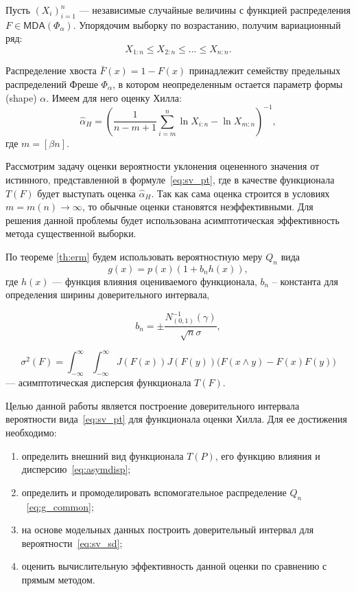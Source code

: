 \documentclass[12pt, specialist, subf, substylefile = spbu.rtx]{disser}
\newcommand{\MDA}{\mathsf{MDA}}
\begin{document}
Пусть $(X_i)_{i=1}^n$ --- независимые случайные величины с функцией распределения $F \in \MDA(\Phi_\alpha)$. Упорядочим выборку по возрастанию, получим вариационный ряд:
$$
X_{1:n} \le X_{2:n} \le ... \le X_{n:n}.
$$

Распределение хвоста $\bar{F}(x)=1-F(x)$ принадлежит семейству предельных распределений Фреше $\Phi_\alpha$, в котором неопределенным остается параметр формы (shape) $\alpha$. Имеем для него оценку Хилла:
\begin{equation}\label{eq:hill_est}
\hat{\alpha}_H=
\left(\frac{1}{n-m+1} \sum\limits_{i=m}^n \ln X_{i:n}-\ln X_{m:n} \right)^{-1},
\end{equation}
где $m=[\beta n]$.

Рассмотрим задачу оценки вероятности уклонения оцененного значения от истинного, представленной в формуле~\eqref{eq:sv_pt}, где в качестве функционала $T(F)$ будет выступать оценка $\hat{\alpha}_H$. Так как сама оценка строится в условиях $m=m(n) \to \infty$, то обычные оценки становятся неэффективными. Для решения данной проблемы будет использована асимптотическая эффективность метода существенной выборки.

По теореме \ref{th:erm} будем использовать вероятностную меру $Q_n$ вида
\begin{equation}\label{eq:g_common}
g(x)=p(x)(1+b_nh(x)),
\end{equation}
где $h(x)$ --- функция влияния оцениваемого функционала, $b_n$ -- константа для определения ширины доверительного интервала, 

\begin{equation}\label{eq:bn}
b_n = \pm\frac{N_{(0,1)}^{-1}(\gamma)}{\sqrt{n}\sigma},
\end{equation}

\begin{equation}\label{eq:asymdisp}
\sigma^2(F)= \int_{-\infty}^\infty \int_{-\infty}^\infty J(F(x)) J(F(y))\big( F(x \wedge y)-F(x)F(y)\big)
\end{equation}
--- асимптотическая дисперсия функционала $T(F)$.

Целью данной работы является построение доверительного интервала вероятности вида~\eqref{eq:sv_pt} для функционала оценки Хилла. Для ее достижения необходимо:

\begin{enumerate}

\item определить внешний вид функционала $T(P)$, его функцию влияния и дисперсию~\eqref{eq:asymdisp};

\item определить и промоделировать вспомогательное распределение $Q_n$~\eqref{eq:g_common};

\item на основе модельных данных построить доверительный интервал для вероятности~\eqref{eq:sv_sd};

\item оценить вычислительную эффективность данной оценки по сравнению с прямым методом.

\end{enumerate}
\end{document}
